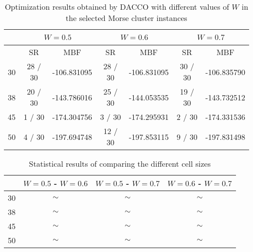 		\begin{table}[!htdp]
				\begin{center}
					\begin{tabular}{| c | c | c | c | c | c | c |}
						\hline
						~ & \multicolumn{2}{c|}{\textbf{$W=0.5$}} & \multicolumn{2}{c|}{\textbf{$W=0.6$}} & \multicolumn{2}{c|}{\textbf{$W=0.7$}} \\ \hline
						~ & SR & MBF & SR & MBF & SR & MBF \\ \hline
						30 & 28 / 30 & -106.831095 & 28 / 30 & -106.831095 & 30 / 30 & -106.835790 \\ \hline
						38 & 20 / 30 & -143.786016 & 25 / 30 & -144.053535 & 19 / 30 & -143.732512 \\ \hline
						45 & 1 / 30 & -174.304756 & 3 / 30 & -174.295931 & 2 / 30 & -174.331536 \\ \hline
						50 & 4 / 30 & -197.694748 & 12 / 30 & -197.853115 & 9 / 30 & -197.831498 \\ \hline
					\end{tabular}
					\caption{Optimization results obtained by DACCO with different values of $W$ in the selected Morse cluster instances}
					\label{tab:cell_size_results}
				\end{center}
		\end{table}
		
		
		
		
		\begin{table}[!htdp]
				\begin{center}
					\begin{tabular}{| c | c | c | c |}
						\hline
						~& \textbf{$W=0.5$ - $W=0.6$} & \textbf{$W=0.5$ - $W=0.7$} & \textbf{$W=0.6$ - $W=0.7$} \\ \hline
						30 & $\sim$ & $\sim$ & $\sim$ \\ \hline
						38 & $\sim$ & $\sim$ & $\sim$ \\ \hline
						45 & $\sim$ & $\sim$ & $\sim$ \\ \hline
						50 & $\sim$ & $\sim$ & $\sim$ \\ \hline
					\end{tabular}
					\caption{Statistical results of comparing the different cell sizes}
					\label{tab:statistical_comparison_cell_size}
				\end{center}
		\end{table}
		
		
		
